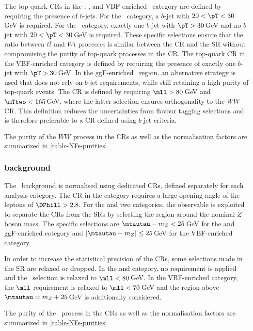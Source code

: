 The top-quark CRs in the \ZeroJet, \OneJet, and VBF-enriched \TwoJet\ category are defined by requiring the presence of $b$-jets. 
For the \ZeroJet\ category, a $b$-jet with $20 < \pT < 30\,$GeV is required.
For the \OneJet\ category, exactly one $b$-jet with $\pT > 30\,$GeV and no $b$-jet with $20 < \pT < 30\,$GeV is required. These specific selections ensure that the ratio between $t\bar{t}$ and $Wt$ processes is similar between the CR and the SR without compromising the purity of top-quark processes in the CR.
The top-quark CR in the VBF-enriched \TwoJet category is defined by requiring the presence of exactly one $b$-jet with $\pT > 30\,$GeV.
In the ggF-enriched \TwoJet\ region, an alternative strategy is used that does not rely on $b$-jet requirements, while still retaining a high purity of top-quark events. The CR is defined by requiring $\mll > 80\,$GeV and $\mTtwo < 165\,$GeV, where the latter selection ensures orthogonality to the $WW$ CR. This definition reduces the uncertainties from flavour tagging selections and is therefore preferable to a CR defined using $b$-jet criteria.

The purity of the $WW$ process in the CRs as well as the normalisation factors are summarized in \cref{table-NFs-purities}.

\subsubsection{\Ztautau background}
The \Ztautau\ background is normalised using dedicated CRs, defined separately for each analysis category. 
The CR in the \ZeroJet category requires a large opening angle of the leptons of $\DPhill > 2.8$.
For the \OneJet and two \TwoJet categories, the \mtautau observable is exploited to separate the \Ztautau CRs from the SRs by selecting the region around the nominal $Z$ boson mass.
The specific selections are $\mtautau - m_Z < 25\,$GeV for the \OneJet and ggF-enriched \TwoJet category and $|\mtautau - m_Z| \le 25\,$GeV for the VBF-enriched \TwoJet category. 

In order to increase the statistical precision of the CRs, some selections made in the SR are relaxed or dropped.
In the \ZeroJet and \OneJet category, no \pTmiss requirement is applied and the \mll\ selection is relaxed to $\mll < 80\,$GeV. 
In the VBF-enriched \TwoJet category, the $\mll$ requirement is relaxed to $\mll < 70\,$GeV and the region above $\mtautau = m_Z + 25\,$GeV is additionally considered.

The purity of the \Ztautau\ process in the CRs as well as the normalisation factors are summarized in \cref{table-NFs-purities}.

